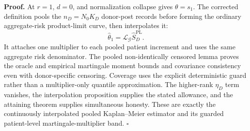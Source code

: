 \textbf{Proof.}
At \(r=1\), \(d=0\), and normalization collapse gives \(\theta=s_1\). The corrected definition pools the \(n_D=N_0K_D\) donor-post records before forming the ordinary aggregate-risk product-limit curve, then interpolates it:
\[
 \widehat\theta_1=\mathcal L_{\mathcal G}\widehat S_D^{\mathrm{PL}}. \tag{1}
\]
It attaches one multiplier to each pooled patient increment and uses the same aggregate risk denominator. The pooled non-identically censored lemma proves the oracle and empirical martingale moment bounds and covariance consistency even with donor-specific censoring. Coverage uses the explicit deterministic guard rather than a multiplier-only quantile approximation. The higher-rank \(\eta_D\) term vanishes, the interpolation proposition supplies the stated allowance, and the attaining theorem supplies simultaneous honesty. These are exactly the continuously interpolated pooled Kaplan--Meier estimator and its guarded patient-level martingale-multiplier band. \(\square\)